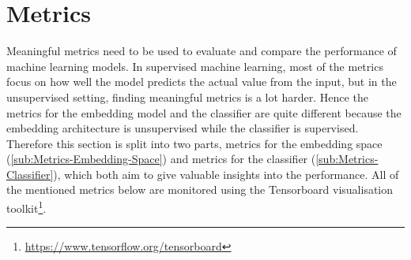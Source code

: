 \section{Metrics}
\label{sec:Metrics}
Meaningful metrics need to be used to evaluate and compare the performance of machine learning models. In supervised machine learning, most of the metrics focus on how well the model predicts the actual value from the input, but in the unsupervised setting, finding meaningful metrics is a lot harder. Hence the metrics for the embedding model and the classifier are quite different because the embedding architecture is unsupervised while the classifier is supervised. Therefore this section is split into two parts, metrics for the embedding space (\ref{sub:Metrics-Embedding-Space}) and metrics for the classifier (\ref{sub:Metrics-Classifier}), which both aim to give valuable insights into the performance. All of the mentioned metrics below are monitored using the Tensorboard visualisation toolkit\footnote{\url{https://www.tensorflow.org/tensorboard}}.

